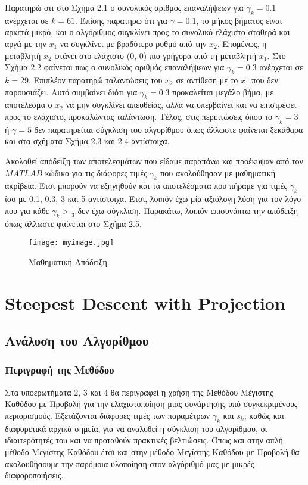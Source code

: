\documentclass[a4paper,12pt]{report}
\newcommand{\en}{\selectlanguage{english}}
\newcommand{\gr}{\selectlanguage{greek}}
\begin{document}
\clearpage
\vspace{0.5cm}

\hspace{-0.6cm}Παρατηρώ ότι στο Σχήμα 2.1 ο συνολικός αριθμός επαναλήψεων για \(\gamma_k = 0.1\) ανέρχεται σε \(k = 61\). Έπίσης παρατηρώ ότι για \(\gamma = 0.1\), το μήκος βήματος είναι αρκετά μικρό, και ο αλγόριθμος συγκλίνει προς το συνολικό ελάχιστο σταθερά και αργά με την \(x_1\) να συγκλίνει με βραδύτερο ρυθμό από την \(x_2\). Επομένως, η μεταβλητή \(x_2\) φτάνει στο ελάχιστο (0, 0) πιο γρήγορα από τη μεταβλητή \(x_1\). Στο Σχήμα 2.2 φαίνεται πως ο συνολικός αριθμός επαναλήψεων για \(\gamma_k = 0.3\) ανέρχεται σε \(k = 29\). Επιπλέον παρατηρώ ταλαντώσεις του \(x_2\) σε αντίθεση με το \(x_1\) που δεν παρουσιάζει. Αυτό συμβαίνει διότι για \(\gamma_k = 0.3\) προκαλείται μεγάλο βήμα, με αποτέλεσμα ο \(x_2\) να μην συγκλίνει απευθείας, αλλά να υπερβαίνει και να επιστρέφει προς το ελάχιστο, προκαλώντας ταλάντωση. Τέλος, στις περιπτώσεις όπου το \(\gamma_k = 3\) ή \(\gamma = 5\) δεν παρατηρείται σύγκλιση του αλγορίθμου όπως άλλωστε φαίνεται ξεκάθαρα και στα σχήματα Σχήμα 2.3 και 2.4 αντίστοιχα.

\vspace{0.5cm}

\hspace{-0.6cm}Aκολοθεί απόδειξη των αποτελεσμάτων που είδαμε παραπάνω και προέκυψαν από τον \(MATLAB\) κώδικα για τις διάφορες τιμές \(\gamma_k\) που ακολούθησαν με μαθηματική ακρίβεια. Έτσι μπορούν να εξηγηθούν και τα αποτελέσματα που πήραμε για τιμές \(\gamma_k\) ίσο με 0.1, 0.3, 3 και 5 αντίστοιχα. Έτσι, λοιπόν έχω μία αξιόλογη λύση για τον λόγο που για κάθε \(\gamma_k > \frac{1}{3}\) δεν έχω σύγκλιση. Παρακάτω, λοιπόν επισυνάπτω την απόδειξη όπως άλλωστε φαίνεται στο Σχήμα 2.5. 

\begin{figure}[ht!]
    \centering
    \texttt{[image: myimage.jpg]} 
    \caption{Μαθηματική Απόδειξη.}
\end{figure}

\chapter{ \en Steepest Descent with Projection \gr}
\section*{Ανάλυση του Αλγορίθμου}
\subsection*{Περιγραφή της Μεθόδου}
Στα υποερωτήματα 2, 3 και 4 θα περιγραφεί η χρήση της Μεθόδου Μέγιστης Καθόδου με Προβολή για την ελαχιστοποίηση μιας συνάρτησης υπό συγκεκριμένους περιορισμούς. Εξετάζονται διάφορες τιμές των παραμέτρων \(\gamma_k\) και \(s_k\), καθώς και διαφορετικά αρχικά σημεία, για να αναλυθεί η σύγκλιση του αλγορίθμου, οι ιδιαιτερότητές του και να προταθούν πρακτικές βελτιώσεις. Όπως και στην απλή μέθοδο Μεγίστης Καθόδου έτσι και στην μέθοδο Μεγίστης Καθόδου με Προβολή θα ακολουθήσουμε την παρόμοια υλοποίηση στον αλγόριθμό μας με μικρές διαφοροποιήσεις. 
\end{document}
